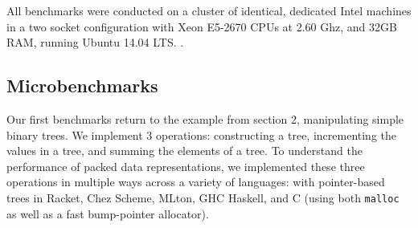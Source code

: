 \documentclass[a4paper,english]{lipics-v2016}
\begin{document}
All benchmarks were conducted on a cluster of identical, dedicated Intel
machines in a two socket configuration with Xeon E5-2670 CPUs at 2.60 Ghz, and
32GB RAM, running Ubuntu 14.04 LTS.
.

\subsection{Microbenchmarks}\label{sec:microbench}

Our first benchmarks return to the example from section 2,
manipulating simple binary trees. We implement 3 operations:
constructing a tree, incrementing the values in a tree, and summing
the elements of a tree. To understand the performance of packed data
representations, we implemented these three operations in multiple
ways across a variety of languages: with pointer-based trees in
Racket, Chez Scheme, MLton, GHC Haskell, and C (using both \texttt{malloc} as well
as a fast bump-pointer allocator).
\end{document}
